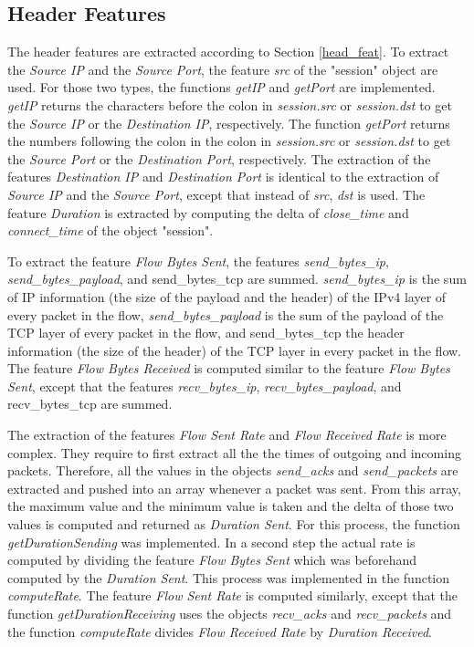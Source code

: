 \subsection{Header Features}
The header features are extracted according to Section \ref{head_feat}. To extract the \textit{Source IP} and the \textit{Source Port}, the feature \textit{src} of the "session" object are used. For those two types, the functions \textit{getIP} and \textit{getPort} are implemented. \textit{getIP} returns the characters before the colon in \textit{session.src} or \textit{session.dst} to get the \textit{Source IP} or the \textit{Destination IP}, respectively. The function \textit{getPort} returns the numbers following the colon in the colon in \textit{session.src} or \textit{session.dst} to get the \textit{Source Port} or the \textit{Destination Port}, respectively. The extraction of the features \textit{Destination IP} and \textit{Destination Port} is identical to the extraction of \textit{Source IP} and the \textit{Source Port}, except that instead of \textit{src}, \textit{dst} is used. The feature \textit{Duration} is extracted by computing the delta of \textit{close\_time} and \textit{connect\_time} of the object "session".

To extract the feature \textit{Flow Bytes Sent}, the features \textit{send\_bytes\_ip}, \textit{send\_bytes\_payload}, and {send\_bytes\_tcp} are summed. \textit{send\_bytes\_ip} is the sum of IP information (the size of the payload and the header) of the IPv4 layer of every packet in the flow, \textit{send\_bytes\_payload} is the sum of the payload of the TCP layer of every packet in the flow, and {send\_bytes\_tcp} the header information (the size of the header) of the TCP layer in every packet in the flow. The feature \textit{Flow Bytes Received} is computed similar to the feature \textit{Flow Bytes Sent}, except that the features \textit{recv\_bytes\_ip}, \textit{recv\_bytes\_payload}, and {recv\_bytes\_tcp} are summed.

The extraction of the features \textit{Flow Sent Rate} and \textit{Flow Received Rate} is more complex. They require to first extract all the the times of outgoing and incoming packets. Therefore, all the values in the objects \textit{send\_acks} and \textit{send\_packets} are extracted and pushed into an array whenever a packet was sent. From this array, the maximum value and the minimum value is taken and the delta of those two values is computed and returned as \textit{Duration Sent}. For this process, the function \textit{getDurationSending} was implemented. In a second step the actual rate is computed by dividing the feature \textit{Flow Bytes Sent} which was beforehand computed by the \textit{Duration Sent}. This process was implemented in the function \textit{computeRate}. The feature \textit{Flow Sent Rate} is computed similarly, except that the function \textit{getDurationReceiving} uses the objects \textit{recv\_acks} and \textit{recv\_packets} and the function \textit{computeRate} divides \textit{Flow Received Rate} by \textit{Duration Received}.

